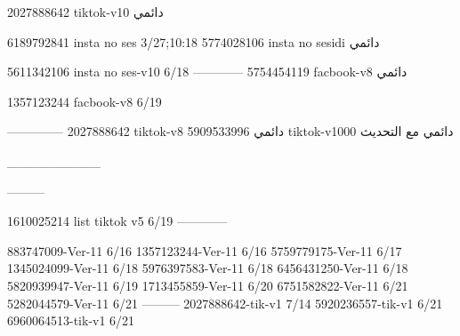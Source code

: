 2027888642 tiktok-v10
دائمي

6189792841 insta no ses
3/27;10:18
5774028106 insta no sesidi
دائمي

5611342106 insta no ses-v10
6/18
------------
5754454119 facbook-v8
دائمي

1357123244 facbook-v8
6/19

--------------
2027888642 tiktok-v8
دائمي
5909533996 tiktok-v1000
دائمي مع التحديث

__________

---------

1610025214 list tiktok v5
6/19
------------

883747009-Ver-11
6/16
1357123244-Ver-11
6/16
5759779175-Ver-11
6/17
1345024099-Ver-11
6/18
5976397583-Ver-11
6/18
6456431250-Ver-11
6/18
5820939947-Ver-11
6/19
1713455859-Ver-11
6/20
6751582822-Ver-11
6/21
5282044579-Ver-11
6/21
---------
2027888642-tik-v1
7/14
5920236557-tik-v1
6/21
6960064513-tik-v1
6/21
